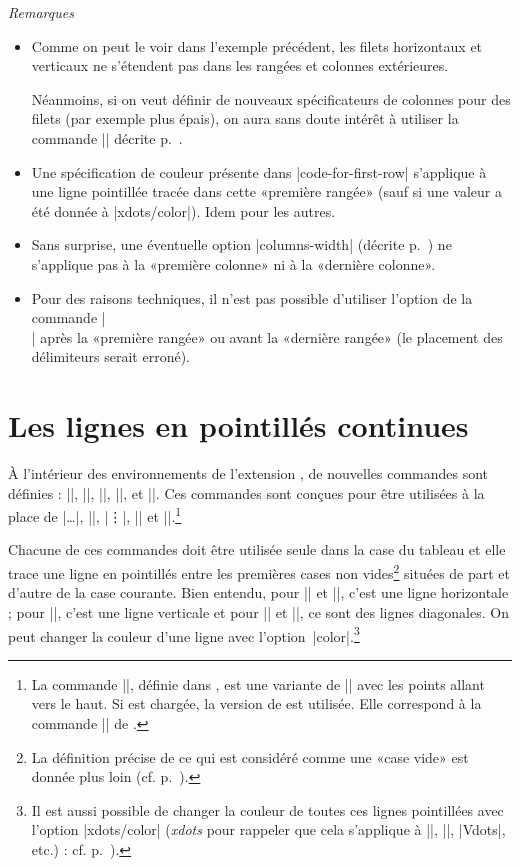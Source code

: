 \documentclass[dvipsnames]{article}%
\begin{document}
\emph{Remarques}
\begin{itemize}[beginpenalty=10000]
\item Comme on peut le voir dans l'exemple précédent, les filets horizontaux et
verticaux ne s'étendent pas dans les rangées et colonnes extérieures.

Néanmoins, si on veut définir de nouveaux spécificateurs de colonnes pour des
filets (par exemple plus épais), on aura sans doute intérêt à utiliser la
commande |\OnlyMainNiceMatrix| décrite p.~\pageref{OnlyMainNiceMatrix}.
\item Une spécification de couleur présente dans |code-for-first-row| s'applique
à une ligne pointillée tracée dans cette «première rangée» (sauf si une valeur a
été donnée à |xdots/color|). Idem pour les autres.
\item Sans surprise, une éventuelle option |columns-width| (décrite
p.~\pageref{width}) ne s'applique pas à la «première colonne» ni à la «dernière
colonne».
\item Pour des raisons techniques, il n'est pas possible d'utiliser l'option de
la commande |\\| après la «première rangée» ou avant la «dernière rangée» (le
placement des délimiteurs serait erroné).
\end{itemize}




\section{Les lignes en pointillés continues}

\label{Cdots}

À l'intérieur des environnements de l'extension , de nouvelles
commandes sont définies : |\Ldots|, |\Cdots|, |\Vdots|, |\Ddots|, et |\Iddots|.
Ces commandes sont conçues pour être utilisées à la place de |\dots|, |\cdots|,
|\vdots|, |\ddots| et |\iddots|.\footnote{La commande |\iddots|, définie dans
  , est une variante de |\ddots| avec les points allant vers le
  haut. Si  est chargée, la version de  est
  utilisée. Elle correspond à la commande |\adots| de .}
 \setcounter{fniddots}{\thefootnote}

\smallskip
Chacune de ces commandes doit être utilisée seule dans la case du tableau et
elle trace une ligne en pointillés entre les premières cases non
vides\footnote{La définition précise de ce qui est considéré comme une «case
  vide» est donnée plus loin (cf. p.~\pageref{empty-cells}).} situées de part et
d'autre de la case courante. Bien entendu, pour |\Ldots| et |\Cdots|, c'est une
ligne horizontale ; pour |\Vdots|, c'est une ligne verticale et pour |\Ddots| et
|\Iddots|, ce sont des lignes diagonales. On peut changer la couleur d'une ligne
avec l'option~|color|.\footnote{Il est aussi possible de changer la couleur de
  toutes ces lignes pointillées avec l'option |xdots/color| (\textsl{xdots} pour
  rappeler que cela s'applique à |\Cdots|, |\Ldots|, |Vdots|, etc.) : cf.
  p.~\pageref{customization}). }\par\nobreak
\end{document}

